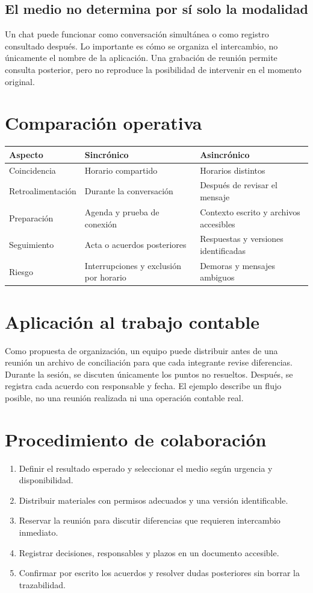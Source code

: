 {\subsection{El medio no determina por sí solo la modalidad}
Un chat puede funcionar como conversación simultánea o como registro consultado después. Lo importante es cómo se organiza el intercambio, no únicamente el nombre de la aplicación. Una grabación de reunión permite consulta posterior, pero no reproduce la posibilidad de intervenir en el momento original.
\section{Comparación operativa}
\noindent\begin{tabularx}{\textwidth}{@{}p{}XX@{}}\toprule
Aspecto & Sincrónico & Asincrónico\\\midrule
Coincidencia & Horario compartido & Horarios distintos\\
Retroalimentación & Durante la conversación & Después de revisar el mensaje\\
Preparación & Agenda y prueba de conexión & Contexto escrito y archivos accesibles\\
Seguimiento & Acta o acuerdos posteriores & Respuestas y versiones identificadas\\
Riesgo & Interrupciones y exclusión por horario & Demoras y mensajes ambiguos\\\bottomrule
\end{tabularx}
\section{Aplicación al trabajo contable}
Como propuesta de organización, un equipo puede distribuir antes de una reunión un archivo de conciliación para que cada integrante revise diferencias. Durante la sesión, se discuten únicamente los puntos no resueltos. Después, se registra cada acuerdo con responsable y fecha. El ejemplo describe un flujo posible, no una reunión realizada ni una operación contable real.
\section{Procedimiento de colaboración}
\begin{enumerate}
\item Definir el resultado esperado y seleccionar el medio según urgencia y disponibilidad.
\item Distribuir materiales con permisos adecuados y una versión identificable.
\item Reservar la reunión para discutir diferencias que requieren intercambio inmediato.
\item Registrar decisiones, responsables y plazos en un documento accesible.
\item Confirmar por escrito los acuerdos y resolver dudas posteriores sin borrar la trazabilidad.
\end{enumerate}
}
